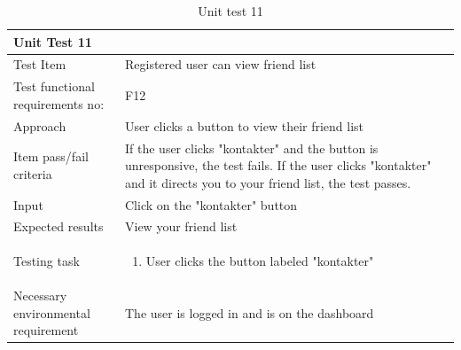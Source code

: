 \begin{table}[H]
\begin{tabular}{ | L{0.25\linewidth} | L{0.75\linewidth} | } 
 \hline {}
 Unit Test 11 &  \\
 \hline
 Test Item & Registered user can view friend list\\
 \hline
 Test functional requirements no: & F12
 \\ 
 \hline
 Approach & User clicks a button to view their friend list\\
  \hline
 Item pass/fail criteria & If the user clicks "kontakter" and the button is unresponsive, the test fails. If the user clicks "kontakter" and it directs you to your friend list, the test passes.\\
 \hline
 Input &  Click on the "kontakter" button\\ 
 \hline
 Expected results & View your friend list\\
  \hline
Testing task &
    \vspace{-5mm}
    \begin{enumerate}[noitemsep]
  \item User clicks the button labeled "kontakter" 
   \end{enumerate}\\
 \hline
 Necessary environmental requirement & The user is logged in and is on the dashboard\\ 
 \hline
\end{tabular}
\caption{Unit test 11}
\end{table}


